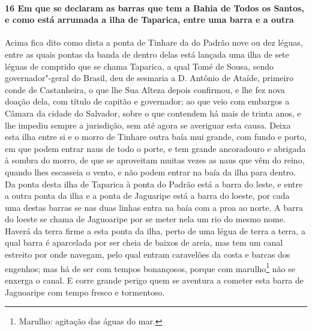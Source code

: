 \paragraph{16 Em que se declaram as barras que tem a Bahia de Todos os Santos, e como está
arrumada a ilha de Taparica, entre uma barra e a outra}

Acima fica dito como dista a ponta de Tinhare da do Padrão nove ou dez léguas, entre as
quais pontas da banda de dentro delas está lançada uma ilha de sete léguas de comprido que
se chama Taparica, a qual Tomé de Sousa, sendo governador"-geral do Brasil, deu de sesmaria
a D. Antônio de Ataíde, primeiro conde de Castanheira, o que lhe Sua Alteza depois
confirmou, e lhe fez nova doação dela, com título de capitão e governador; ao que veio com
embargos a Câmara da cidade do Salvador, sobre o que contendem há mais de trinta anos, e
lhe impediu sempre a jurisdição, sem até agora se averiguar esta causa. Deixa esta ilha
entre si e o morro de Tinhare outra baía mui grande, com fundo e porto, em que podem
entrar naus de todo o porte, e tem grande ancoradouro e abrigada à sombra do morro, de que
se aproveitam muitas vezes as naus que vêm do reino, quando lhes escasseia o vento, e não
podem entrar na baía da ilha para dentro. Da ponta desta ilha de Taparica à ponta do
Padrão está a barra do leste, e entre a outra ponta da ilha e a 
ponta de Jaguaripe está a barra do loeste, por cada uma destas barras se 
nas duas linhas entra na baía com a proa ao norte. A barra do loeste se chama de Jaguoaripe
por se meter nela um rio do mesmo nome. Haverá da terra firme a esta ponta da ilha, perto
de uma légua de terra a terra, a qual barra é aparcelada por ser cheia de baixos de areia,
mas tem um canal estreito por onde navegam, pelo qual entram caravelões da costa e barcas
dos engenhos; mas há de ser com tempos bonançosos, porque com marulho\footnote{ Marulho:
agitação das águas do mar.} não se enxerga o canal. E corre grande perigo quem se aventura
a cometer esta barra de Jaguoaripe com tempo fresco e tormentoso.

